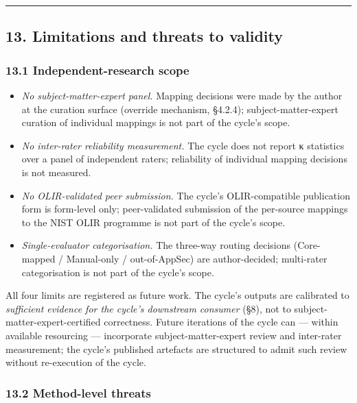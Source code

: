 \documentclass[
]{article}
\providecommand{\tightlist}{%
  \setlength{\itemsep}{0pt}\setlength{\parskip}{0pt}}
\begin{document}
\begin{center}\rule{0.5\linewidth}{0.5pt}\end{center}

\subsection{13. Limitations and threats to
validity}\label{limitations-and-threats-to-validity}

\subsubsection{13.1 Independent-research
scope}\label{independent-research-scope}

\begin{itemize}
\tightlist
\item
  \emph{No subject-matter-expert panel.} Mapping decisions were made by
  the author at the curation surface (override mechanism, §4.2.4);
  subject-matter-expert curation of individual mappings is not part of
  the cycle's scope.
\item
  \emph{No inter-rater reliability measurement.} The cycle does not
  report κ statistics over a panel of independent raters; reliability of
  individual mapping decisions is not measured.
\item
  \emph{No OLIR-validated peer submission.} The cycle's OLIR-compatible
  publication form is form-level only; peer-validated submission of the
  per-source mappings to the NIST OLIR programme is not part of the
  cycle's scope.
\item
  \emph{Single-evaluator categorisation.} The three-way routing
  decisions (Core-mapped / Manual-only / out-of-AppSec) are
  author-decided; multi-rater categorisation is not part of the cycle's
  scope.
\end{itemize}

All four limits are registered as future work. The cycle's outputs are
calibrated to \emph{sufficient evidence for the cycle's downstream
consumer} (§8), not to subject-matter-expert-certified correctness.
Future iterations of the cycle can --- within available resourcing ---
incorporate subject-matter-expert review and inter-rater measurement;
the cycle's published artefacts are structured to admit such review
without re-execution of the cycle.

\subsubsection{13.2 Method-level threats}\label{method-level-threats}
\end{document}

